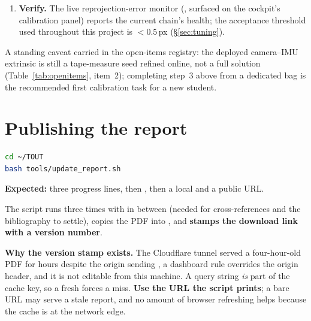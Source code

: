 \begin{enumerate}[leftmargin=1.4em]
  \emph{It is not the D455's own IMU.} That distinction matters because the
  two are not interchangeable: they sit in different frames, and the
  camera--IMU extrinsic $^{I}\mathbf{T}_{C}$ calibrated here is the transform
  to the \emph{body} IMU. The D455's motion module is physically present ---
  it enumerates as a USB HID interface and the RealSense driver reports
   --- but it is disabled in the driver, and
  the streams it would publish on  have never been used by
  this project (Table~\ref{tab:openitems}).
\item \textbf{Verify.} The live reprojection-error monitor
  (, surfaced on the cockpit's calibration
  panel) reports the current chain's health; the acceptance threshold used
  throughout this project is $<0.5$\,px (\S\ref{sec:tuning}).
\end{enumerate}

\noindent A standing caveat carried in the open-items registry: the deployed
camera--IMU extrinsic is still a tape-measure seed refined online, not a full
 solution (Table~\ref{tab:openitems},
item~2); completing step~3 above from a dedicated bag is the recommended
first calibration task for a new student.
\section{Publishing the report}
\label{ap:repro-report}
\begin{lstlisting}[language=bash]
cd ~/TOUT
bash tools/update_report.sh
\end{lstlisting}
\textbf{Expected:} three progress lines, then
, then a local and a public URL.

The script runs  three times with  in between
(needed for cross-references and the bibliography to settle), copies the PDF
into , and \textbf{stamps the download link with a version
number}.

\noindent \textbf{Why the version stamp exists.} The Cloudflare tunnel served a
four-hour-old PDF for hours despite the origin sending
, a dashboard rule overrides the origin
header, and it is not editable from this machine. A query string \emph{is} part
of the cache key, so a fresh  forces a miss. \textbf{Use the URL the
script prints}; a bare URL may serve a stale report, and no amount of browser
refreshing helps because the cache is at the network edge.

